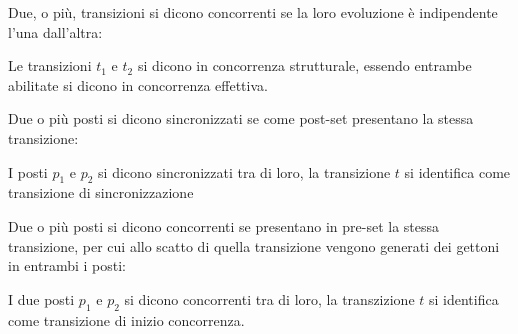 \documentclass{article}
\numberwithin{equation}{subsection}
\begin{document}
Due, o più, transizioni si dicono concorrenti se la loro evoluzione è indipendente l'una dall'altra:
\begin{center}
\end{center}
Le transizioni $t_1$ e $t_2$ si dicono in concorrenza strutturale, essendo entrambe abilitate si dicono in concorrenza effettiva. 



Due o più posti si dicono sincronizzati se come post-set presentano la stessa transizione:
\begin{center}
\end{center}
I posti $p_1$ e $p_2$ si dicono sincronizzati tra di loro, la transizione $t$ si identifica come transizione di sincronizzazione


Due o più posti si dicono concorrenti se presentano in pre-set la stessa transizione, per cui allo scatto di quella transizione vengono generati dei gettoni in entrambi i posti:
\begin{center}
\end{center}
I due posti $p_1$ e $p_2$ si dicono concorrenti tra di loro, la transzizione $t$ si identifica come transizione di inizio concorrenza. 
\end{document}
